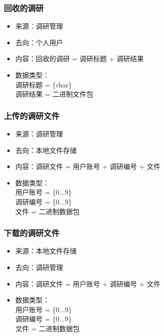             \subsubsection{\color{red} 回收的调研}
            \begin{itemize}
                \item 来源：调研管理
                \item 去向：个人用户
                \item 内容：回收的调研 = 调研标题 + 调研结果
                \item 数据类型：\\
                    调研标题 = \{char\}\\
                    调研结果 = 二进制文件包\\
            \end{itemize}
            
            \subsubsection{\color{red} 上传的调研文件}
            \begin{itemize}
            \item 来源：调研管理
            \item 去向：本地文件存储
            \item 内容：调研文件 = 用户账号 + 调研编号 + 文件
            \item 数据类型：\\
            用户账号 = \{0...9\}\\
            调研编号 = \{0...9\}\\
            文件 = 二进制数据包\\
            \end{itemize}

            \subsubsection{\color{red} 下载的调研文件}
            \begin{itemize}
            \item 来源：本地文件存储
            \item 去向：调研管理
            \item 内容：调研文件 = 用户账号 + 调研编号 + 文件
            \item 数据类型：\\
            用户账号 = \{0...9\}\\
            调研编号 = \{0...9\}\\
            文件 = 二进制数据包\\
            \end{itemize}

